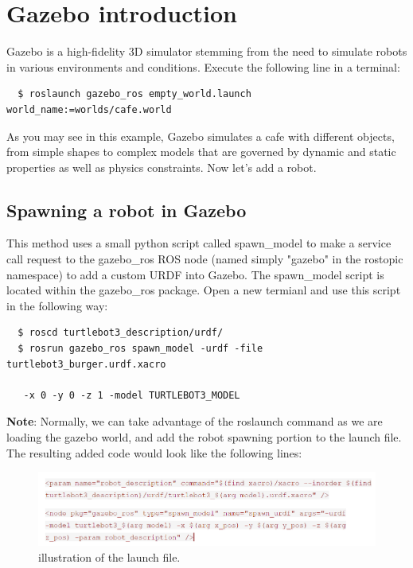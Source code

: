 \documentclass[12pt]{article}
\begin{document}
	\MakeScribeTop

 

\section {Gazebo introduction}
Gazebo is a high-fidelity 3D simulator stemming from the need to
simulate robots in various environments and conditions.
Execute the following line in a terminal:

\begin{verbatim}
  $ roslaunch gazebo_ros empty_world.launch world_name:=worlds/cafe.world
\end{verbatim}

As you may see in this example, Gazebo simulates a cafe with different objects, from simple shapes to complex models that are governed by dynamic and static properties as well as physics constraints. Now let’s add a robot. 

\subsection{Spawning a robot in Gazebo}

This method uses a small python script called spawn\_model to make a service call request to the gazebo\_ros ROS node (named simply "gazebo" in the rostopic namespace) to add a custom URDF into Gazebo. The spawn\_model script is located within the gazebo\_ros package. Open a new termianl and use this script in the following way:
\begin{verbatim}
  $ roscd turtlebot3_description/urdf/
  $ rosrun gazebo_ros spawn_model -urdf -file turtlebot3_burger.urdf.xacro
  
   -x 0 -y 0 -z 1 -model TURTLEBOT3_MODEL 
\end{verbatim}

\textbf{Note}: Normally, we can take advantage of the roslaunch command as we are loading the gazebo world, and add the robot spawning portion to the launch file. The resulting added code would look like the following lines:
\begin{figure}[H]
  \vspace{-10pt}
  \centering\includegraphics[width=14cm]{images/lab1gazebo.png}\vspace{-10pt}
  \caption{illustration of the launch file.}\label{fig:omni}
  \end{figure}
\end{document}
